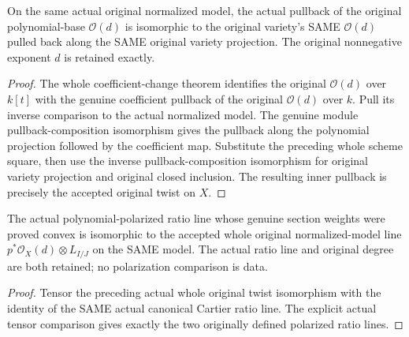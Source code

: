 \begin{theorem}
\label{local:actual-normalized-polynomial-original-twist-iso}
\leanok
{}
On the same actual original normalized model, the actual pullback of the
original polynomial-base $\mathcal O(d)$ is isomorphic to the original
variety's SAME $\mathcal O(d)$ pulled back along the SAME original variety
projection. The original nonnegative exponent $d$ is retained exactly.
\end{theorem}
\begin{proof}
The whole coefficient-change theorem identifies the original $\mathcal O(d)$
over $k[t]$ with the genuine coefficient pullback of the original
$\mathcal O(d)$ over $k$. Pull its inverse comparison to the actual normalized
model. The genuine module pullback-composition isomorphism gives the pullback
along the polynomial projection followed by the coefficient map. Substitute
the preceding whole scheme square, then use the inverse pullback-composition
isomorphism for original variety projection and original closed inclusion.
The resulting inner pullback is precisely the accepted original twist on $X$.
\end{proof}

\begin{theorem}
\label{local:actual-normalized-polynomial-original-ratio-line-iso}
\leanok
{}
The actual polynomial-polarized ratio line whose genuine section weights were
proved convex is isomorphic to the accepted whole original normalized-model
line $p^*\mathcal O_X(d)\otimes L_{I/J}$ on the SAME model. The actual ratio
line and original degree are both retained; no polarization comparison is data.
\end{theorem}
\begin{proof}
Tensor the preceding actual whole original twist isomorphism with the identity
of the SAME actual canonical Cartier ratio line. The explicit actual tensor
comparison gives exactly the two originally defined polarized ratio lines.
\end{proof}
